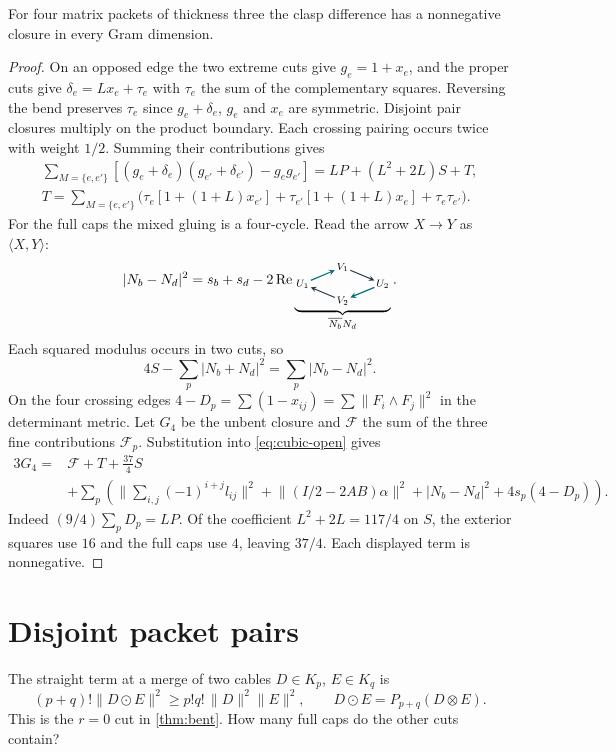 \documentclass[a4paper,11pt]{amsart}
\numberwithin{equation}{subsection}
\theoremstyle{plain}
\theoremstyle{definition}
\newcommand{\FigCubicMatchingGluing}{%
\begin{tikzpicture}[baseline=(current bounding box.center),x=5.3mm,y=4.2mm,
every node/.style={inner sep=1pt,font=\scriptsize},
capB/.style={draw=wiActive,line width=.9pt,->,>=stealth},
capD/.style={draw=wiStrand,line width=.8pt,->,>=stealth}]
\node (u) at (0,1){$U_1$}; \node(v) at(1.9,2){$V_1$};
\node (w) at (3.8,1){$U_2$}; \node(z) at(1.9,0){$V_2$};
\draw[capB](u)--(v); \draw[capD](v)--(w);
\draw[capB](w)--(z); \draw[capD](z)--(u);
\end{tikzpicture}%
}
\begin{document}
\begin{theorem}\label{thm:fourcubic}
For four matrix packets of thickness three the clasp difference has a nonnegative closure in every Gram dimension.
\end{theorem}
\begin{proof}
On an opposed edge the two extreme cuts give $g_e=1+x_e$, and the proper cuts give $\delta_e=Lx_e+\tau_e$ with $\tau_e$ the sum of the complementary squares. Reversing the bend preserves $\tau_e$ since $g_e+\delta_e$, $g_e$ and $x_e$ are symmetric. Disjoint pair closures multiply on the product boundary. Each crossing pairing occurs twice with weight $1/2$. Summing their contributions gives
\begin{gather*}
\sum_{M=\{e,e'\}}
[(g_e+\delta_e)(g_{e'}+\delta_{e'})-g_e g_{e'}]
= L P+(L^2+2L)S+T,\\[-1pt]
T=\sum_{M=\{e,e'\}}\bigl(
\tau_e[1+(1+L)x_{e'}]+\tau_{e'}[1+(1+L)x_e]+\tau_e\tau_{e'}\bigr).
\end{gather*}
For the full caps the mixed gluing is a four-cycle. Read the arrow $X\to Y$ as $\langle X,Y\rangle$:
\[
|N_b-N_d|^2=s_b+s_d-2\operatorname{Re}
\underbrace{
\FigCubicMatchingGluing
}_{\overline{N_b}N_d}.
\]
Each squared modulus occurs in two cuts, so
\[
4S-\sum_p|N_b+N_d|^2=\sum_p|N_b-N_d|^2 .
\]
On the four crossing edges $4-D_p=\sum(1-x_{ij})=\sum\|F_i\wedge F_j\|^2$ in the determinant metric. Let $G_4$ be the unbent closure and $\mathcal F$ the sum of the three fine contributions $\mathcal F_p$. Substitution into \autoref{eq:cubic-open} gives
\begin{align*}
3G_4={}&\mathcal F+T+\tfrac{37}{4}S\\
&+\sum_p\left(
\Big\|\sum_{i,j}(-1)^{i+j}l_{ij}\Big\|^2
+\Big\|(I/2-2AB)\alpha\Big\|^2
+|N_b-N_d|^2+4s_p(4-D_p)\right).
\end{align*}
Indeed $(9/4)\sum_pD_p=LP$. Of the coefficient $L^2+2L=117/4$ on $S$, the exterior squares use $16$ and the full caps use $4$, leaving $37/4$. Each displayed term is nonnegative.
\end{proof}

\section{Disjoint packet pairs}\label{sec:threshold}

The straight term at a merge of two cables $D\in K_p$, $E\in K_q$ is
\begin{equation}\label{eq:th-straight}
(p+q)!\|D\odot E\|^2\ge p!q!\,\|D\|^2\|E\|^2,
\qquad D\odot E=P_{p+q}(D\otimes E).
\end{equation}
This is the $r=0$ cut in \autoref{thm:bent}. How many full caps do the other cuts contain?
\end{document}

